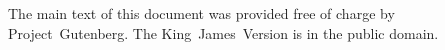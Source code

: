 The main text of this document was provided free of charge by Project~Gutenberg.
The King~James~Version is in the public domain.
